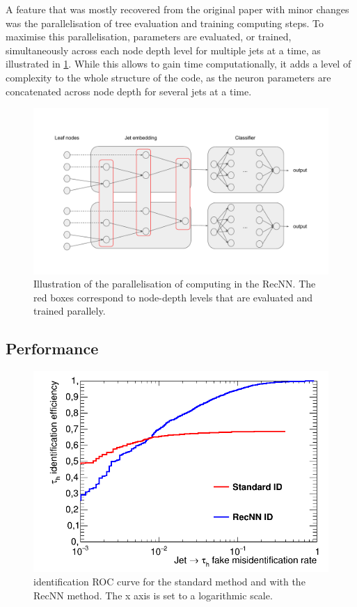A feature that was mostly recovered from the original paper with minor changes was the parallelisation of tree evaluation and training computing steps. To maximise this parallelisation, parameters are evaluated, or trained, simultaneously across each node depth level for multiple jets at a time, as illustrated in \ref{fig:RecNN_parall}. While this allows to gain time computationally, it adds a level of complexity to the whole structure of the code, as the neuron parameters are concatenated across node depth for several jets at a time.

\begin{figure}
    \centering
    \includegraphics[width=\textwidth]{Images/RecNN_diagram_parall.pdf}
    \caption{Illustration of the parallelisation of computing in the RecNN. The red boxes correspond to node-depth levels that are evaluated and trained parallely.}
    \label{fig:RecNN_parall}
\end{figure}

\subsection{Performance}

\begin{figure}
    \centering
    \includegraphics[width=\textwidth]{Images/ROC_comp.png}
    \caption{\tauh identification ROC curve for the standard method and with the RecNN method. The x axis is set to a logarithmic scale.}
    \label{fig:RecNN_ROC}
\end{figure}

